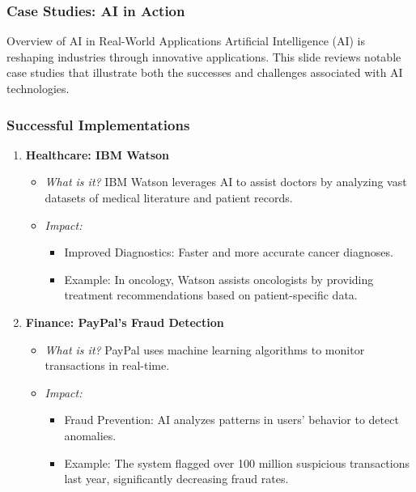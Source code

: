 \documentclass[aspectratio=169]{beamer}
\begin{document}
\begin{frame}[fragile]
  \frametitle{Case Studies: AI in Action}
  \begin{block}{Overview of AI in Real-World Applications}
    Artificial Intelligence (AI) is reshaping industries through innovative applications. This slide reviews notable case studies that illustrate both the successes and challenges associated with AI technologies.
  \end{block}
\end{frame}

\begin{frame}[fragile]
  \frametitle{Successful Implementations}
  \begin{enumerate}
    \item \textbf{Healthcare: IBM Watson}
      \begin{itemize}
        \item \textit{What is it?} IBM Watson leverages AI to assist doctors by analyzing vast datasets of medical literature and patient records.
        \item \textit{Impact:}
          \begin{itemize}
            \item Improved Diagnostics: Faster and more accurate cancer diagnoses.
            \item Example: In oncology, Watson assists oncologists by providing treatment recommendations based on patient-specific data.
          \end{itemize}
      \end{itemize}
      
    \item \textbf{Finance: PayPal's Fraud Detection}
      \begin{itemize}
        \item \textit{What is it?} PayPal uses machine learning algorithms to monitor transactions in real-time.
        \item \textit{Impact:}
          \begin{itemize}
            \item Fraud Prevention: AI analyzes patterns in users' behavior to detect anomalies.
            \item Example: The system flagged over 100 million suspicious transactions last year, significantly decreasing fraud rates.
          \end{itemize}
      \end{itemize}
  \end{enumerate}
\end{frame}
\end{document}
